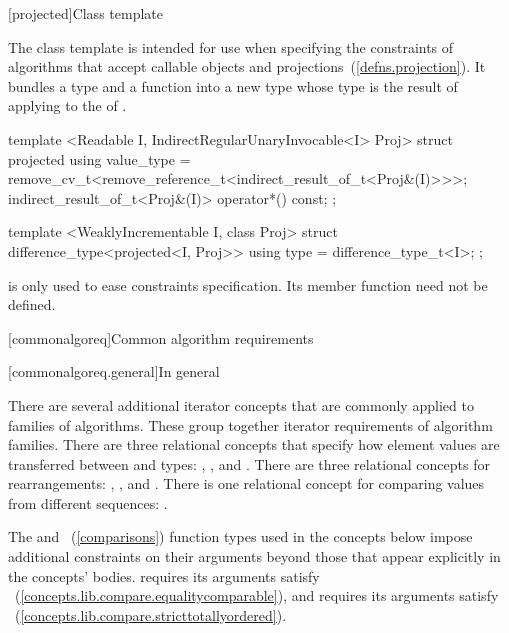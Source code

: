[projected]{Class template }

\pnum
The  class template is intended for use when specifying the constraints of
algorithms that accept callable objects and projections~(\ref{defns.projection}). It bundles a  type
 and a function  into a new  type whose
 type is the result of applying  to the
 of .

%
\begin{codeblock}
  template <Readable I, IndirectRegularUnaryInvocable<I> Proj>
  struct projected {
    using value_type = remove_cv_t<remove_reference_t<indirect_result_of_t<Proj&(I)>>>;
    indirect_result_of_t<Proj&(I)> operator*() const;
  };

  template <WeaklyIncrementable I, class Proj>
  struct difference_type<projected<I, Proj>> {
    using type = difference_type_t<I>;
  };
\end{codeblock}

\pnum
\enternote {} is only used to ease constraints specification. Its
member function need not be defined.\exitnote

[commonalgoreq]{Common algorithm requirements}

[commonalgoreq.general]{In general}

\pnum
There are several additional iterator concepts that are commonly applied to families of algorithms.
These group together iterator requirements of algorithm families. There are three relational
concepts that specify how element values are transferred between  and  types:
, , and . There are three relational concepts
for rearrangements: , , and .
There is one relational concept for comparing values from different sequences: .

\pnum
\enternote The  and ~(\ref{comparisons}) function types used in the
concepts below impose additional constraints on their arguments beyond those that appear explicitly in the
concepts' bodies.  requires its arguments satisfy ~(\ref{concepts.lib.compare.equalitycomparable}),
and  requires its arguments satisfy ~(\ref{concepts.lib.compare.stricttotallyordered}).\exitnote

